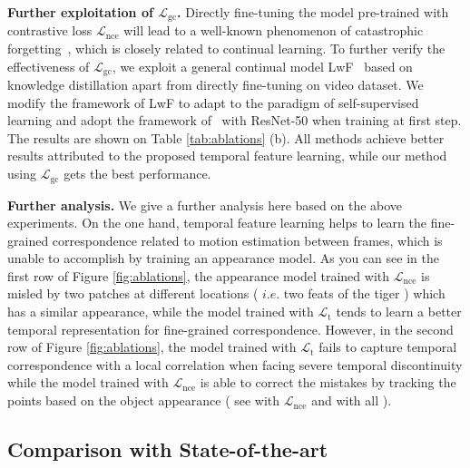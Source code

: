 \documentclass{article}
\begin{document}
\textbf{Further exploitation of $\mathcal{L}_{\mathrm{gc}}$.}  Directly fine-tuning the model pre-trained with contrastive loss $\mathcal{L}_{\mathrm{nce}}$ will lead to a well-known phenomenon of catastrophic forgetting~\cite{li2017learning}, which is closely related to continual learning. To further verify the effectiveness of  $\mathcal{L}_{\mathrm{gc}}$, we exploit a general continual model LwF~\cite{li2017learning}  based on knowledge distillation apart from directly fine-tuning on video dataset. We modify the framework of LwF to adapt to the paradigm of self-supervised learning and adopt the framework of~\cite{xie2021detco} with ResNet-50 when training at first step. The results are shown on Table \ref{tab:ablations} (b). All methods achieve better results attributed to the proposed temporal feature learning, while our method using $\mathcal{L}_{\mathrm{gc}}$ gets the best performance. 

\textbf{Further analysis.} 
We give a further analysis here based on the above experiments. On the one hand, temporal feature learning helps to learn the fine-grained correspondence related to motion estimation between frames, which is unable to accomplish by training an appearance model. As you can see in the first row of Figure \ref{fig:ablations}, the appearance model trained with $\mathcal{L}_{\mathrm{nce}}$ is misled by two patches at different locations ( $i.e.$ two feats of the tiger ) which has a similar appearance, while the model trained with $\mathcal{L}_{\mathrm{t}}$ tends to learn a better temporal representation for fine-grained correspondence. However, in the second row of Figure \ref{fig:ablations}, the model trained with $\mathcal{L}_{\mathrm{t}}$ fails to capture temporal correspondence with a local correlation when facing severe temporal discontinuity while the model trained with $\mathcal{L}_{\mathrm{nce}}$ is able to correct the mistakes by tracking the points based on the object appearance ( see with $\mathcal{L}_{\mathrm{nce}}$ and with all ).

\subsection{Comparison with State-of-the-art}
\end{document}
